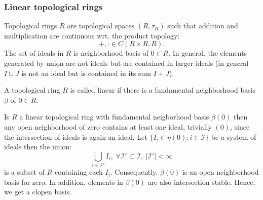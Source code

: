 \subsubsection{Linear topological rings}
Topological rings $R$ are topological spaces $(R,\tau_R)$ such that addition and multiplication are continuous wrt. the product topology:
$$+, \cdot \in C(R\times R,R).$$%
The set of ideals in $R$ is neighborhood basis of $0 \in R$. In general, the elements generated by union are not ideals but are contained in larger ideals (in general $I \cup J$ is not an ideal but is contained in its sum $I + J$).
\begin{defi}
A topological ring $R$ is called linear if there is a fundamental neighborhood basis $\beta$ of $0 \in R$.
\end{defi}
Is $R$ a linear topological ring with fundamental neigborhood basis $\beta(0)$ then any open neighborhood of zero contains at least one ideal, trivially $(0)$, since the intersection of ideals is again an ideal. Let $\{I_i \in \eta(0) : i \in \mathcal{I}\}$ be a system of ideals then the union:
$$\bigcup_{i \in \mathcal{I}'} I_i,\ \forall \mathcal{I}' \subset \mathcal{I},\ |\mathcal{I}'| < \infty$$
is a subset of $R$ containing each $I_i$. Consequently, $\beta(0)$ is an open neighborhood basis for zero. In addition, elements in $\beta(0)$ are also intersection stable. Hence, we get a clopen basis.
